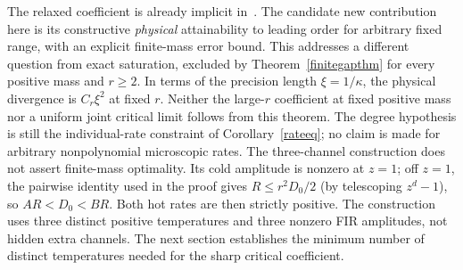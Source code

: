 \documentclass[11pt]{article}
\begin{document}
The relaxed coefficient is already implicit in~\cite[Eq.~(15)]{gopal}. The candidate new contribution here is its constructive \emph{physical} attainability to leading order for arbitrary fixed range, with an explicit finite-mass error bound. This addresses a different question from exact saturation, excluded by Theorem~\ref{finitegapthm} for every positive mass and $r\ge2$. In terms of the precision length $\xi=1/\kappa$, the physical divergence is $C_r\xi^2$ at fixed $r$. Neither the large-$r$ coefficient at fixed positive mass nor a uniform joint critical limit follows from this theorem. The degree hypothesis is still the individual-rate constraint of Corollary~\ref{rateeq}; no claim is made for arbitrary nonpolynomial microscopic rates. The three-channel construction does not assert finite-mass optimality. Its cold amplitude is nonzero at $z=1$; off $z=1$, the pairwise identity used in the proof gives $R\le r^2 D_0/2$ (by telescoping $z^d-1$), so $AR<D_0<BR$. Both hot rates are then strictly positive. The construction uses three distinct positive temperatures and three nonzero FIR amplitudes, not hidden extra channels. The next section establishes the minimum number of distinct temperatures needed for the sharp critical coefficient.
\end{document}

